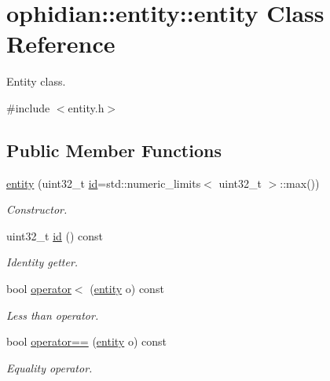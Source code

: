 \hypertarget{classophidian_1_1entity_1_1entity}{\section{ophidian\-:\-:entity\-:\-:entity Class Reference}
\label{classophidian_1_1entity_1_1entity}
}


Entity class.  




{\ttfamily \#include $<$entity.\-h$>$}

\subsection*{Public Member Functions}
\begin{DoxyCompactItemize}
\item 
\hyperlink{classophidian_1_1entity_1_1entity_aaa4177448814c2fd7132d6ac0b76f815}{entity} (uint32\-\_\-t \hyperlink{classophidian_1_1entity_1_1entity_aa1df88866fbc6850dfbdfb80a6a9485a}{id}=std\-::numeric\-\_\-limits$<$ uint32\-\_\-t $>$\-::max())
\begin{DoxyCompactList}\small\item\em Constructor. \end{DoxyCompactList}\item 
uint32\-\_\-t \hyperlink{classophidian_1_1entity_1_1entity_aa1df88866fbc6850dfbdfb80a6a9485a}{id} () const 
\begin{DoxyCompactList}\small\item\em Identity getter. \end{DoxyCompactList}\item 
bool \hyperlink{classophidian_1_1entity_1_1entity_a8511456c7bf90b0083a3bc713db5e6c9}{operator$<$} (\hyperlink{classophidian_1_1entity_1_1entity}{entity} o) const 
\begin{DoxyCompactList}\small\item\em Less than operator. \end{DoxyCompactList}\item 
bool \hyperlink{classophidian_1_1entity_1_1entity_a2267c36aa1b130e8c78ff1a98f47bb54}{operator==} (\hyperlink{classophidian_1_1entity_1_1entity}{entity} o) const 
\begin{DoxyCompactList}\small\item\em Equality operator. \end{DoxyCompactList}\end{DoxyCompactItemize}



